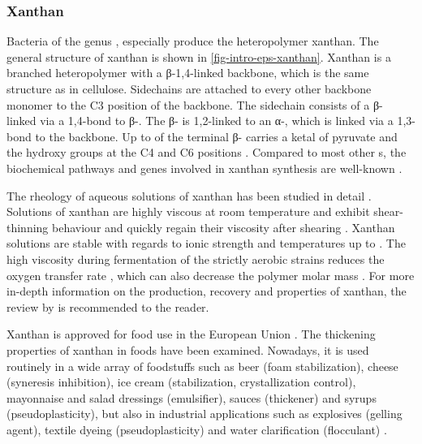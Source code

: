 \subsubsection{Xanthan\label{subsubsec-intro-eps-commercial-xanthan}}
Bacteria of the genus , especially  produce the heteropolymer xanthan. The general structure of xanthan is shown in \vref{fig-intro-eps-xanthan}. Xanthan is a branched heteropolymer with a β-1,4-linked \glc{} backbone, which is the same structure as in cellulose. Sidechains are attached to every other backbone monomer to the C3 position of the backbone. The sidechain consists of a β-\man{} linked via a 1,4-bond to β-\glcua{}. The β-\glcua{} is 1,2-linked to an α-\man{}, which is linked via a 1,3-bond to the backbone. Up to  of the terminal β-\man{} carries a ketal of pyruvate and the hydroxy groups at the C4 and C6 positions \cite{Jansson1975}. Compared to most other \eps{}s, the biochemical pathways and genes involved in xanthan synthesis are well-known \cite{Becker1998}.

The rheology of aqueous solutions of xanthan has been studied in detail \cite{Whitcomb1975, Rinaudo1978, Milas1986, Richardson1987, Rochefort1987, Nolte1992, Becker1998}. Solutions of xanthan are highly viscous at room temperature and exhibit shear-thinning behaviour \cite{Rinaudo1978, Milas1986, Richardson1987, Nolte1992} and quickly regain their viscosity after shearing \cite{Chen1980}. Xanthan solutions are stable with regards to ionic strength \cite{Rinaudo1978} and temperatures up to  \cite{Rochefort1987}. The high viscosity during fermentation of the strictly aerobic strains reduces the oxygen transfer rate \cite{Becker1998}, which can also decrease the polymer molar mass \cite{Suh1990}. For more in-depth information on the production, recovery and properties of xanthan, the review by \textcite{GarciaOchoa2000} is recommended to the reader.

Xanthan is approved for food use in the European Union \cite{EURegulation11292011}. The thickening properties of xanthan in foods have been examined. Nowadays, it is used routinely in a wide array of foodstuffs such as beer (foam stabilization), cheese (syneresis inhibition), ice cream (stabilization, crystallization control), mayonnaise and salad dressings (emulsifier), sauces (thickener) and syrups (pseudoplasticity), but also in industrial applications such as explosives (gelling agent), textile dyeing (pseudoplasticity) and water clarification (flocculant) \cite{Sandvik1977, Becker1998, Ma1995a, Ma1995b, Sandford1983, Sutherland1993}.

